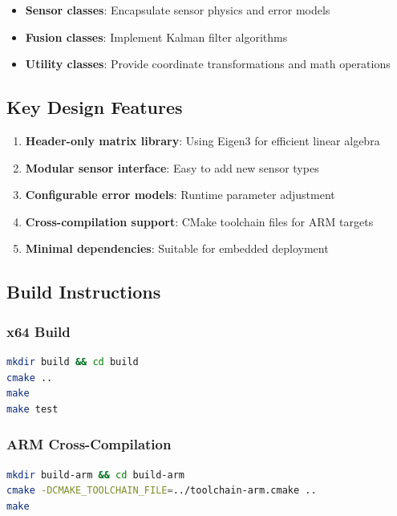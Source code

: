 \documentclass[12pt,a4paper]{article}
\begin{document}
\begin{itemize}
    \item \textbf{Sensor classes}: Encapsulate sensor physics and error models
    \item \textbf{Fusion classes}: Implement Kalman filter algorithms
    \item \textbf{Utility classes}: Provide coordinate transformations and math operations
\end{itemize}

\subsection{Key Design Features}

\begin{enumerate}
    \item \textbf{Header-only matrix library}: Using Eigen3 for efficient linear algebra
    \item \textbf{Modular sensor interface}: Easy to add new sensor types
    \item \textbf{Configurable error models}: Runtime parameter adjustment
    \item \textbf{Cross-compilation support}: CMake toolchain files for ARM targets
    \item \textbf{Minimal dependencies}: Suitable for embedded deployment
\end{enumerate}

\subsection{Build Instructions}

\subsubsection{x64 Build}

\begin{lstlisting}[language=bash]
mkdir build && cd build
cmake ..
make
make test
\end{lstlisting}

\subsubsection{ARM Cross-Compilation}

\begin{lstlisting}[language=bash]
mkdir build-arm && cd build-arm
cmake -DCMAKE_TOOLCHAIN_FILE=../toolchain-arm.cmake ..
make
\end{lstlisting}
\end{document}

